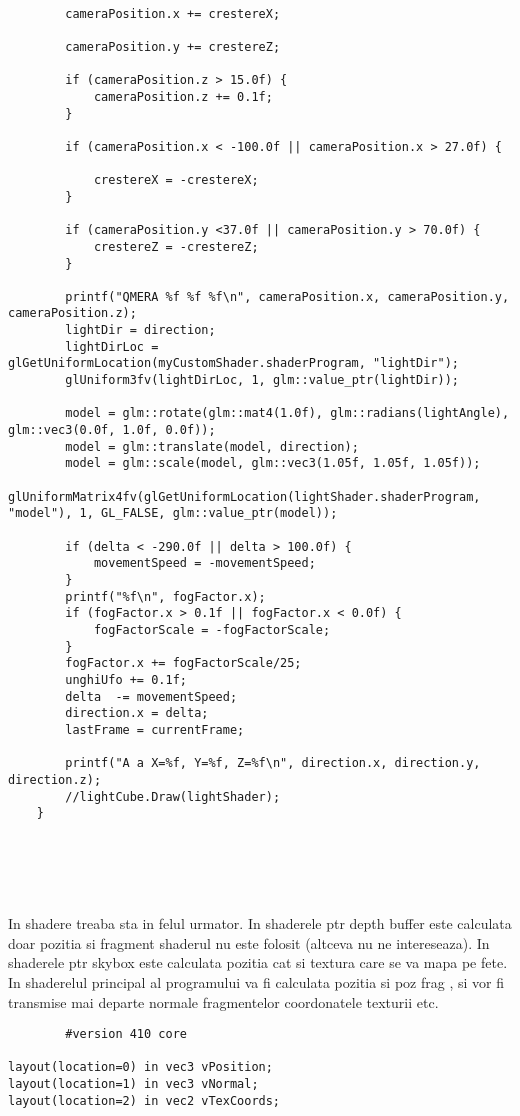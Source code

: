 \begin{itemize}
\begin{verbatim}
		
		cameraPosition.x += crestereX;
	
		cameraPosition.y += crestereZ;

		if (cameraPosition.z > 15.0f) {
			cameraPosition.z += 0.1f;
		}
		
		if (cameraPosition.x < -100.0f || cameraPosition.x > 27.0f) {
			
			crestereX = -crestereX;
		}

		if (cameraPosition.y <37.0f || cameraPosition.y > 70.0f) {
			crestereZ = -crestereZ;
		}
		
		printf("QMERA %f %f %f\n", cameraPosition.x, cameraPosition.y, cameraPosition.z);
		lightDir = direction;
		lightDirLoc = glGetUniformLocation(myCustomShader.shaderProgram, "lightDir");
		glUniform3fv(lightDirLoc, 1, glm::value_ptr(lightDir));
	
		model = glm::rotate(glm::mat4(1.0f), glm::radians(lightAngle), glm::vec3(0.0f, 1.0f, 0.0f));
		model = glm::translate(model, direction);
		model = glm::scale(model, glm::vec3(1.05f, 1.05f, 1.05f));
		glUniformMatrix4fv(glGetUniformLocation(lightShader.shaderProgram, "model"), 1, GL_FALSE, glm::value_ptr(model));
		
		if (delta < -290.0f || delta > 100.0f) {
			movementSpeed = -movementSpeed;
		}
		printf("%f\n", fogFactor.x);
		if (fogFactor.x > 0.1f || fogFactor.x < 0.0f) {
			fogFactorScale = -fogFactorScale;
		}
		fogFactor.x += fogFactorScale/25;
		unghiUfo += 0.1f;
		delta  -= movementSpeed;
		direction.x = delta;
		lastFrame = currentFrame;

		printf("A a X=%f, Y=%f, Z=%f\n", direction.x, direction.y, direction.z);
		//lightCube.Draw(lightShader);
	}
	\end{verbatim}
	\\	
	\\
	\\	
	\\
	\tab In shadere treaba sta in felul urmator. In shaderele ptr depth buffer este calculata doar pozitia si fragment shaderul nu este folosit (altceva nu ne intereseaza).
	\tab In shaderele ptr skybox este calculata pozitia cat si textura care se va mapa pe fete.\\
	\tab In shaderelul principal al programului va fi calculata pozitia si poz frag , si vor fi transmise mai departe normale fragmentelor coordonatele texturii etc.\\
	\begin{verbatim}
		#version 410 core

layout(location=0) in vec3 vPosition;
layout(location=1) in vec3 vNormal;
layout(location=2) in vec2 vTexCoords;


\end{verbatim}
\end{itemize}
